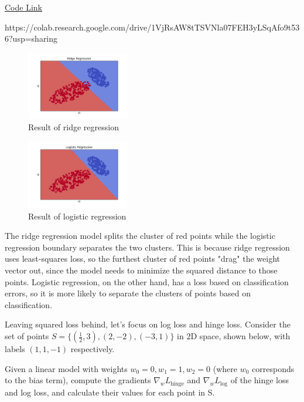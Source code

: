 \begin{solution}
  \href{https://colab.research.google.com/drive/1VjRsAW8tTSVNla07FEH3yLSqAfo9t536?usp=sharing}{Code Link}

  https://colab.research.google.com/drive/1VjRsAW8tTSVNla07FEH3yLSqAfo9t536?usp=sharing

  \begin{figure}[H]
    \centering
    \includegraphics[width=0.4\textwidth]{images/1b_ridge.png}
    \caption{Result of ridge regression}
    \label{fig:1b_ridge}
  \end{figure}

  \begin{figure}[H]
    \centering
    \includegraphics[width=0.4\textwidth]{images/1b_log.png}
    \caption{Result of logistic regression}
    \label{fig:1b_log}
  \end{figure}

  The ridge regression model splits the cluster of red points while the logistic regression boundary separates the two clusters. This is because ridge regression uses least-squares loss, so the furthest cluster of red points "drag" the weight vector out, since the model needs to minimize the squared distance to those points. Logistic regression, on the other hand, has a loss based on classification errors, so it is more likely to separate the clusters of points based on classification.
\end{solution}

\newpage

\problem[9]
Leaving squared loss behind, let's focus on log loss and hinge loss. Consider the set of points $S = \{(\frac{1}{2}, 3), (2, -2), (-3, 1)\}$ in 2D space, shown below, with labels $(1, 1, -1)$ respectively.

Given a linear model with weights $w_0 = 0, w_1 = 1, w_2 = 0$ (where $w_0$ corresponds to the bias term), compute the gradients $\nabla_{w}L_{\text{hinge}}$ and $\nabla_{w}L_{\text{log}}$ of the hinge loss and log loss, and calculate their values for each point in S.

